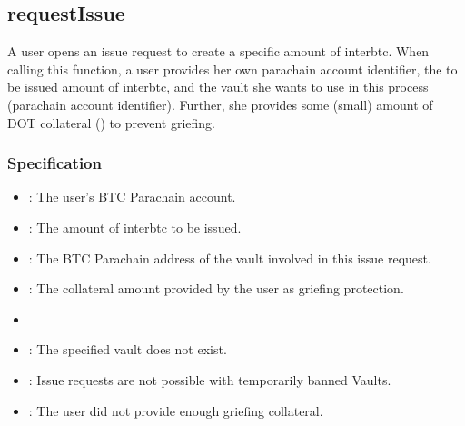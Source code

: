 \documentclass[a4paper,10pt,english]{sphinxmanual}
\begin{document}
\subsection{requestIssue}
\label{\detokenize{spec/issue:requestissue}}\label{\detokenize{spec/issue:id2}}
A user opens an issue request to create a specific amount of interbtc.
When calling this function, a user provides her own parachain account identifier, the to be issued amount of interbtc, and the vault she wants to use in this process (parachain account identifier). Further, she provides some (small) amount of DOT collateral () to prevent griefing.


\subsubsection{Specification}
\label{\detokenize{spec/issue:specification}}


\begin{itemize}
\item {} 
: The user’s BTC Parachain account.

\item {} 
: The amount of interbtc to be issued.

\item {} 
: The BTC Parachain address of the vault involved in this issue request.

\item {} 
: The collateral amount provided by the user as griefing protection.

\end{itemize}

\begin{itemize}
\item {} 

\end{itemize}

\begin{itemize}
\item {} 
: The specified vault does not exist.

\item {} 
: Issue requests are not possible with temporarily banned Vaults.

\item {} 
: The user did not provide enough griefing collateral.

\end{itemize}
\end{document}
